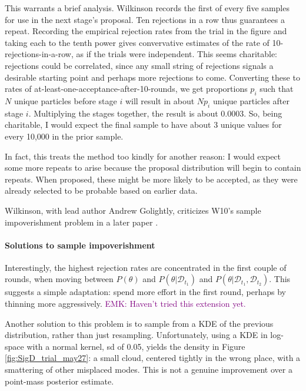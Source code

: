 \documentclass{article}
\newcommand\EMK[1]{\textcolor{purple}{EMK: #1}}
\begin{document}
This warrants a brief analysis. Wilkinson records the first of every five samples for use in the next stage's proposal. Ten rejections in a row thus guarantees a repeat. Recording the empirical rejection rates from the trial in the figure and taking each to the tenth power gives convervative estimates of the rate of 10-rejections-in-a-row, as if the trials were independent. This seems charitable: rejections could be correlated, since any small string of rejections signals a desirable starting point and perhaps more rejections to come. Converting these to rates of at-least-one-acceptance-after-10-rounds, we get proportions $p_i$ such that $N$ unique particles before stage $i$ will result in about $Np_i$ unique particles after stage $i$. Multiplying the stages together, the result is about 0.0003. So, being charitable, I would expect the final sample to have about 3 unique values for every 10,000 in the prior sample.

In fact, this treats the method too kindly for another reason: I would expect some more repeats to arise because the proposal distribution will begin to contain repeats. When proposed, these might be more likely to be accepted, as they were already selected to be probable based on earlier data. 

Wilkinson, with lead author Andrew Golightly, criticizes W10's sample impoverishment problem in a later paper \cite{golightly2011bayesian}. 

\paragraph{Solutions to sample impoverishment}
Interestingly, the highest rejection rates are concentrated in the first couple of rounds, when moving between $P(\theta)$ and $P(\theta|\mathcal{D}_{t_1})$ and $P(\theta|\mathcal{D}_{t_1}, \mathcal{D}_{t_2})$. This suggests a simple adaptation: spend more effort in the first round, perhaps by thinning more aggressively. \EMK{Haven't tried this extension yet.}

Another solution to this problem is to sample from a KDE of the previous distribution, rather than just resampling. %
Unfortunately, using a KDE in log-space with a normal kernel, sd of 0.05, yields the density in Figure \ref{fig:SigD_trial_may27}: a small cloud, centered tightly in the wrong place, with a smattering of other misplaced modes. This is not a genuine improvement over a point-mass posterior estimate. 
\end{document}
